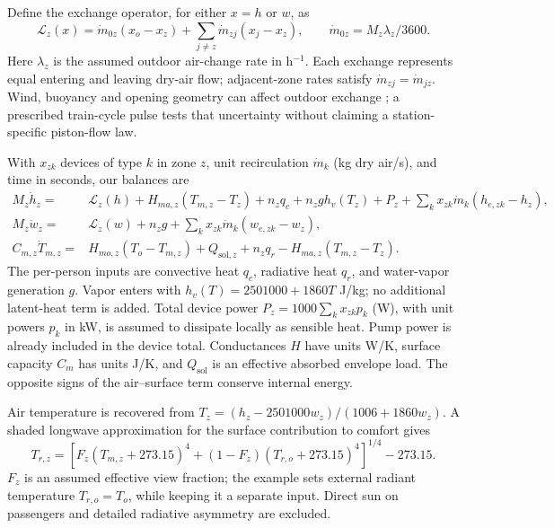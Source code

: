 Define the exchange operator, for either $x=h$ or $w$, as
\begin{equation}
 \mathcal L_z(x)=\dot m_{0z}(x_o-x_z)+\sum_{j\ne z}\dot m_{zj}(x_j-x_z),
 \qquad \dot m_{0z}=M_z\lambda_z/3600.
\label{eq:rail-exchange}
\end{equation}
Here $\lambda_z$ is the assumed outdoor air-change rate in h$^{-1}$. Each exchange represents equal entering and leaving dry-air flow; adjacent-zone rates satisfy $\dot m_{zj}=\dot m_{jz}$. Wind, buoyancy and opening geometry can affect outdoor exchange \cite{ventilation}; a prescribed train-cycle pulse tests that uncertainty without claiming a station-specific piston-flow law.

With $x_{zk}$ devices of type $k$ in zone $z$, unit recirculation $\dot m_k$ (kg dry air/s), and time in seconds, our balances are
\begin{align}
 M_z\dot h_z={}&\mathcal L_z(h)+H_{ma,z}(T_{m,z}-T_z)
 +n_zq_c+n_zg h_v(T_z)+P_z
 +\sum_k x_{zk}\dot m_k(h_{e,zk}-h_z),\label{eq:rail-enthalpy}\\
 M_z\dot w_z={}&\mathcal L_z(w)+n_zg+
 \sum_k x_{zk}\dot m_k(w_{e,zk}-w_z),\label{eq:rail-moisture}\\
 C_{m,z}\dot T_{m,z}={}&H_{mo,z}(T_o-T_{m,z})+Q_{\mathrm{sol},z}
 +n_zq_r-H_{ma,z}(T_{m,z}-T_z).\label{eq:rail-surface}
\end{align}
The per-person inputs are convective heat $q_c$, radiative heat $q_r$, and water-vapor generation $g$. Vapor enters with $h_v(T)=2501000+1860T$ J/kg; no additional latent-heat term is added. Total device power $P_z=1000\sum_k x_{zk}p_k$ (W), with unit powers $p_k$ in kW, is assumed to dissipate locally as sensible heat. Pump power is already included in the device total. Conductances $H$ have units W/K, surface capacity $C_m$ has units J/K, and $Q_{\mathrm{sol}}$ is an effective absorbed envelope load. The opposite signs of the air--surface term conserve internal energy.

Air temperature is recovered from $T_z=(h_z-2501000w_z)/(1006+1860w_z)$. A shaded longwave approximation for the surface contribution to comfort \cite{thermalcomfort} gives
\begin{equation}
 T_{r,z}=\left[F_z(T_{m,z}+273.15)^4+(1-F_z)(T_{r,o}+273.15)^4\right]^{1/4}-273.15.
\label{eq:rail-mrt}
\end{equation}
$F_z$ is an assumed effective view fraction; the example sets external radiant temperature $T_{r,o}=T_o$, while keeping it a separate input. Direct sun on passengers and detailed radiative asymmetry are excluded.

